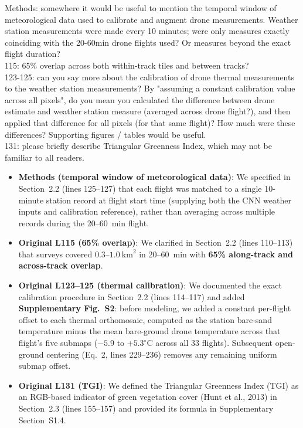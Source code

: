 \documentclass[12pt,english]{reviewresponse}
\begin{document}
\begin{revcomment}
Methods: somewhere it would be useful to mention the temporal window of meteorological data used to calibrate and augment drone measurements. Weather station measurements were made every 10 minutes; were only measures exactly coinciding with the 20-60min drone flights used? Or measures beyond the exact flight duration?\\
115: 65\% overlap across both within-track tiles and between tracks?\\
123-125: can you say more about the calibration of drone thermal measurements to the weather station measurements? By "assuming a constant calibration value across all pixels", do you mean you calculated the difference between drone estimate and weather station measure (averaged across drone flight?), and then applied that difference for all pixels (for that same flight)? How much were these differences? Supporting figures / tables would be useful.\\
131: please briefly describe Triangular Greenness Index, which may not be familiar to all readers.
\end{revcomment}

\begin{revresponse}
\begin{itemize}[leftmargin=*, itemsep=0.2em]
    \item \textbf{Methods (temporal window of meteorological data)}: We specified in Section~2.2 (lines 125--127) that each flight was matched to a single 10-minute station record at flight start time (supplying both the CNN weather inputs and calibration reference), rather than averaging across multiple records during the 20--60~min flight.
    \item \textbf{Original L115 (65\% overlap)}: We clarified in Section~2.2 (lines 110--113) that surveys covered $0.3\text{--}1.0~\text{km}^2$ in 20--60~min with \textbf{65\% along-track and across-track overlap}.
    \item \textbf{Original L123--125 (thermal calibration)}: We documented the exact calibration procedure in Section~2.2 (lines 114--117) and added \textbf{Supplementary Fig.~S2}: before modeling, we added a constant per-flight offset to each thermal orthomosaic, computed as the station bare-sand temperature minus the mean bare-ground drone temperature across that flight's five submaps ($-5.9$ to $+5.3^\circ\mathrm{C}$ across all 33 flights). Subsequent open-ground centering (Eq.~2, lines 229--236) removes any remaining uniform submap offset.
    \item \textbf{Original L131 (TGI)}: We defined the Triangular Greenness Index (TGI) as an RGB-based indicator of green vegetation cover (Hunt et al., 2013) in Section~2.3 (lines 155--157) and provided its formula in Supplementary Section~S1.4.
\end{itemize}
\end{revresponse}
\end{document}
